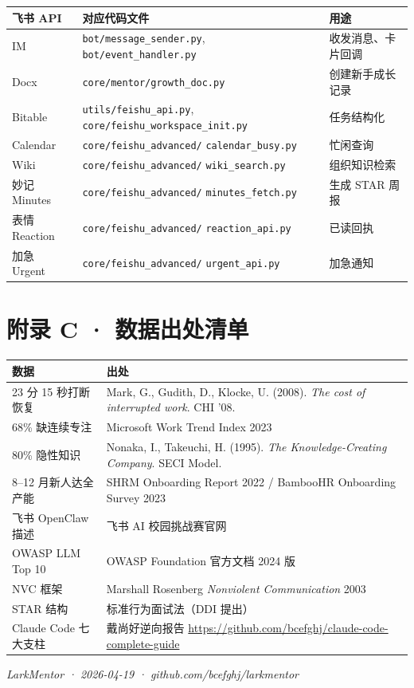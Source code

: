 \documentclass[11pt,a4paper]{ctexart}
\begin{document}
{\small
\begin{tabular}{p{2.4cm}>{\raggedright\arraybackslash}p{6.4cm}p{5.2cm}}
\toprule
\textbf{飞书 API} & \textbf{对应代码文件} & \textbf{用途} \\
\midrule
IM & \texttt{bot/message\_sender.py}, \newline \texttt{bot/event\_handler.py} & 收发消息、卡片回调 \\
Docx & \texttt{core/mentor/growth\_doc.py} & 创建新手成长记录 \\
Bitable & \texttt{utils/feishu\_api.py}, \newline \texttt{core/feishu\_workspace\_init.py} & 任务结构化 \\
Calendar & \texttt{core/feishu\_advanced/} \newline \texttt{calendar\_busy.py} & 忙闲查询 \\
Wiki & \texttt{core/feishu\_advanced/} \newline \texttt{wiki\_search.py} & 组织知识检索 \\
妙记 Minutes & \texttt{core/feishu\_advanced/} \newline \texttt{minutes\_fetch.py} & 生成 STAR 周报 \\
表情 Reaction & \texttt{core/feishu\_advanced/} \newline \texttt{reaction\_api.py} & 已读回执 \\
加急 Urgent & \texttt{core/feishu\_advanced/} \newline \texttt{urgent\_api.py} & 加急通知 \\
\bottomrule
\end{tabular}
}

\section*{附录 C · 数据出处清单}

\begin{tabular}{p{6cm}p{8cm}}
\toprule
\textbf{数据} & \textbf{出处} \\
\midrule
23 分 15 秒打断恢复 & Mark, G., Gudith, D., Klocke, U. (2008). \emph{The cost of interrupted work}. CHI '08. \\
68\% 缺连续专注 & Microsoft Work Trend Index 2023 \\
80\% 隐性知识 & Nonaka, I., Takeuchi, H. (1995). \emph{The Knowledge-Creating Company}. SECI Model. \\
8--12 月新人达全产能 & SHRM Onboarding Report 2022 / BambooHR Onboarding Survey 2023 \\
飞书 OpenClaw 描述 & 飞书 AI 校园挑战赛官网 \\
OWASP LLM Top 10 & OWASP Foundation 官方文档 2024 版 \\
NVC 框架 & Marshall Rosenberg \emph{Nonviolent Communication} 2003 \\
STAR 结构 & 标准行为面试法（DDI 提出）\\
Claude Code 七大支柱 & 戴尚好逆向报告 \url{https://github.com/bcefghj/claude-code-complete-guide} \\
\bottomrule
\end{tabular}

\vfill
\hfill\textit{\small\color{soft} LarkMentor · 2026-04-19 · github.com/bcefghj/larkmentor}
\end{document}
